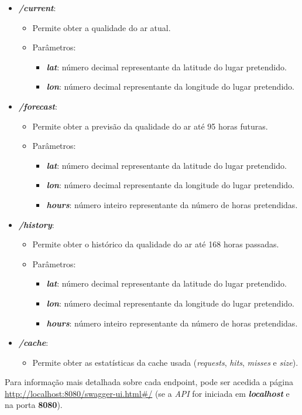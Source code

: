 \begin{itemize}
   \item \textbf{\textit{/current}}:
      \begin{itemize}
         \item Permite obter a qualidade do ar atual.
         \item Parâmetros:
            \begin{itemize}
               \item \textbf{\textit{lat}}: número decimal representante da latitude do lugar pretendido.
               \item \textbf{\textit{lon}}: número decimal representante da longitude do lugar pretendido.
            \end{itemize}
      \end{itemize}
   \item \textbf{\textit{/forecast}}:
      \begin{itemize}
         \item Permite obter a previsão da qualidade do ar até 95 horas futuras.
         \item Parâmetros:
            \begin{itemize}
               \item \textbf{\textit{lat}}: número decimal representante da latitude do lugar pretendido.
               \item \textbf{\textit{lon}}: número decimal representante da longitude do lugar pretendido.
               \item \textbf{\textit{hours}}: número inteiro representante da número de horas pretendidas.
            \end{itemize}
      \end{itemize}
   \item \textbf{\textit{/history}}:
      \begin{itemize}
         \item Permite obter o histórico da qualidade do ar até 168 horas passadas.
         \item Parâmetros:
            \begin{itemize}
               \item \textbf{\textit{lat}}: número decimal representante da latitude do lugar pretendido.
               \item \textbf{\textit{lon}}: número decimal representante da longitude do lugar pretendido.
               \item \textbf{\textit{hours}}: número inteiro representante da número de horas pretendidas.
            \end{itemize}
      \end{itemize}
   \item \textbf{\textit{/cache}}:
      \begin{itemize}
         \item Permite obter as estatísticas da cache usada (\textit{requests}, \textit{hits}, \textit{misses} e \textit{size}).
      \end{itemize}
\end{itemize}

Para informação mais detalhada sobre cada endpoint, pode ser acedida a página \url{http://localhost:8080/swagger-ui.html#/} (se a \textit{API} for iniciada em \textbf{\textit{localhost}} e na porta \textbf{8080}).
